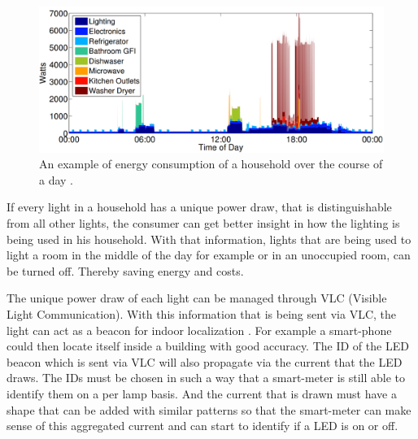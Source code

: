 \begin{figure}[t]
	\centering
	\includegraphics[width=\textwidth]{chapters/introduction-chapters/energy-consumption-house.png}
	\caption{An example of energy consumption of a household over the course of a day \cite{kolter2011redd}.}
	\label{fig:energy-consumption-house}
\end{figure}




If every light in a household has a unique power draw, that is distinguishable from all other lights, the consumer can get better insight in how the lighting is being used in his household. 
With that information, lights that are being used to light a room in the middle of the day for example or in an unoccupied room, can be turned off.
Thereby saving energy and costs.


The unique power draw of each light can be managed through VLC (Visible Light Communication).
With this information that is being sent via VLC, the light can act as a beacon for indoor localization \cite{Kuo:2014:LIP:2639108.2639109}.
For example a smart-phone could then locate itself inside a building with good accuracy.
The ID of the LED beacon which is sent via VLC will also propagate via the current that the LED draws.
The IDs must be chosen in such a way that a smart-meter is still able to identify them on a per lamp basis.
And the current that is drawn must have a shape that can be added with similar patterns so that the smart-meter can make sense of this aggregated current and can start to identify if a LED is on or off.




















